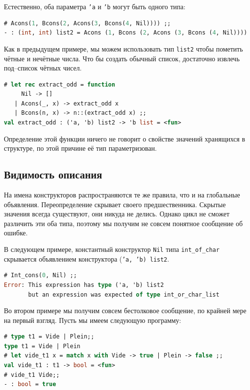 Естественно, оба параметра \texttt{'a} и \texttt{'b} могут быть одного типа:

\begin{lstlisting}[language=OCaml]
# Acons(1, Bcons(2, Acons(3, Bcons(4, Nil)))) ;;
- : (int, int) list2 = Acons (1, Bcons (2, Acons (3, Bcons (4, Nil))))
\end{lstlisting}

Как в предыдущем примере, мы можем использовать тип \texttt{list2} чтобы
пометить чётные и нечётные числа. Что бы создать обычный список, достаточно
извлечь под--список чётных чисел.

\begin{lstlisting}[language=OCaml]
# let rec extract_odd = function
     Nil -> []
   | Acons(_, x) -> extract_odd x
   | Bcons(n, x) -> n::(extract_odd x) ;;
val extract_odd : ('a, 'b) list2 -> 'b list = <fun>
\end{lstlisting}

Определение этой функции ничего не говорит о свойстве значений хранящихся в
структуре, по этой причине её тип параметризован.

\subsection{Видимость описания}

На имена конструкторов распространяются те же правила, что и на глобальные
объявления. Переопределение скрывает своего предшественника. Скрытые значения
всегда существуют, они никуда не делись. Однако цикл не сможет различить эти оба
типа, поэтому мы получим не совсем понятное сообщение об ошибке.

В следующем примере, константный конструктор \texttt{Nil} типа
\texttt{int\_of\_char} скрывается объявлением конструктора (\texttt{'a, 'b)
list2}.

\begin{lstlisting}[language=OCaml]
# Int_cons(0, Nil) ;;
Error: This expression has type ('a, 'b) list2
       but an expression was expected of type int_or_char_list
\end{lstlisting}

Во втором примере мы получим совсем бестолковое сообщение, по крайней мере на
первый взгляд. Пусть мы имеем следующую программу:

\begin{lstlisting}[language=OCaml]
# type t1 = Vide | Plein;;
type t1 = Vide | Plein
# let vide_t1 x = match x with Vide -> true | Plein -> false ;;
val vide_t1 : t1 -> bool = <fun>
# vide_t1 Vide;;
- : bool = true
\end{lstlisting}

